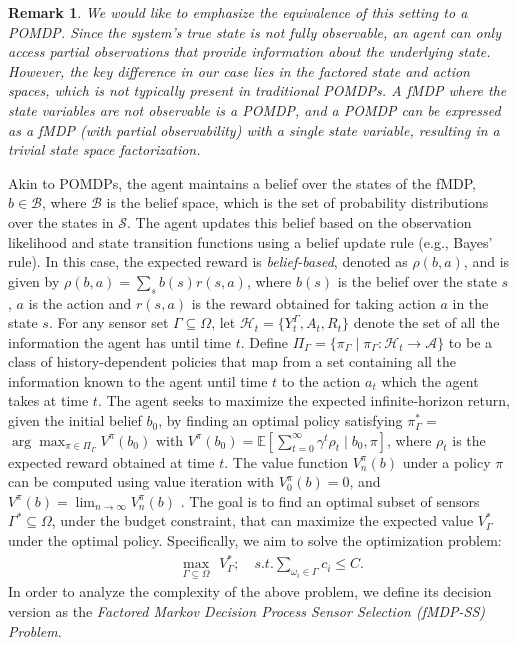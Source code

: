 \documentclass[twocolumn]{autart}    %
\newtheorem{remark}{Remark}
\begin{document}
 \begin{remark}
 \label{remark:pomdp}
     We would like to emphasize the equivalence of this setting to a POMDP. Since the system's true state is not fully observable, an agent can only access partial observations that provide information about the underlying state. However, the key difference in our case lies in the factored state and action spaces, which is not typically present in traditional POMDPs. A fMDP where the state variables are not observable is a POMDP, and a POMDP can be expressed as a fMDP (with partial observability) with a single state variable, resulting in a trivial state space factorization. 
 \end{remark}
 Akin to POMDPs, the agent maintains a belief over the states of the fMDP, $b \in \mathcal{B}$, where $\mathcal{B}$ is the belief space, which is the set of probability distributions over the states in $\mathcal{S}$. The agent updates this belief based on the observation likelihood and state transition functions using a belief update rule (e.g., Bayes' rule). In this case, the expected reward is \textit{belief-based}, denoted as $\rho(b,a)$, and is given by $\rho(b,a) = \sum_{s} b(s)r(s,a)$,  where $b(s)$ is the belief over the state $s$, $a$ is the action and $r(s,a)$ is the reward obtained for taking action $a$ in the state $s$. 
For any sensor set $\Gamma \subseteq \Omega $, let $\mathcal{H}_t = \{ Y^{\Gamma}_t,A_t,R_t\}$ denote the set of all the information the agent has until time $t$. Define $\Pi_\Gamma = \{ \pi_\Gamma \mid \pi_\Gamma : \mathcal{H}_t \rightarrow \mathcal{A}\}$ to be a class of history-dependent  policies that map from a set containing all the information known to the agent until time $t$ to the action $a_t$ which the agent takes at time $t$.  The agent seeks to maximize the expected infinite-horizon return, given the initial belief $b_0$, by finding an optimal policy satisfying  $\pi_\Gamma^*=$ $\arg \max _{\pi \in \Pi_\Gamma} V^\pi\left(b_0\right)$ with $V^\pi\left(b_0\right)=\mathbb{E}\left[\sum_{t=0}^{\infty}\gamma^t \rho_t \mid b_0, \pi\right]$,
where $\rho_t$ is the expected reward obtained at time $t$. 
The value function $V^\pi_{n}(b)$ under a policy $\pi$ can be computed using value iteration with $V^{\pi}_0(b)=0$, and $V^\pi(b)= \lim_{n \rightarrow \infty} V^{\pi}_{n}(b)$ \cite{araya2010closer}. 
 The goal is to find an optimal subset of sensors $\Gamma^* \subseteq \Omega$, under the budget constraint, that can maximize the expected value $V^*_\Gamma$ under the optimal policy. Specifically, we aim to solve the optimization problem: 
\begin{align}
& \hspace{10pt}  \max_{\Gamma \subseteq \Omega} \hspace{5pt}  V_\Gamma^* ; \quad\textit{s.t.} \sum_{\omega_i \in \Gamma} c_i  \leq C.
\end{align}
\vspace{-0.2mm}
In order to analyze the complexity of the above problem, we define its decision version as  the \textit{Factored Markov Decision Process Sensor Selection (fMDP-SS)  Problem}.
\end{document}
